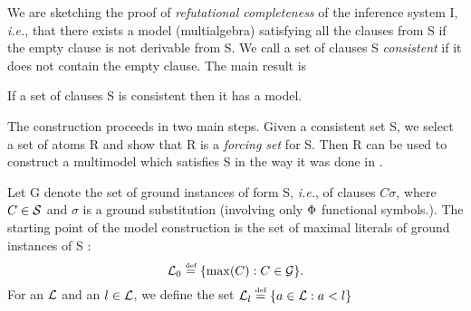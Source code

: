 %
%
%
We are sketching the proof of {\em refutational completeness} of the inference system
\C I, {\em i.e.}, that there exists a model (multialgebra) satisfying all the
clauses from \C S if the empty clause is not derivable from \C S.  We call a
set of clauses \C S {\em consistent} if it does not contain the empty clause.
The main result is

\begin{theorem}\label{completeness}
If a set of clauses \C S is consistent then it has a model.
\end{theorem}
\noindent
The construction proceeds in two main steps. Given a consistent set \C S,
we select a set of atoms \C R %
and show that \C R is a {\em forcing set}\/ for \C S.
Then %
\C R can be used to construct a multimodel which satisfies \C S in the
way it was done in \cite{KW}. 


Let \C G denote the set of ground instances of form \C S, {\it i.e.}, of
clauses \(C\sigma\), where \(C\in \mbox {$\cal S$}\) and $\sigma$ is a ground
substitution (involving only $\Phi$ functional symbols.).  
The starting point of the model construction is the set of
maximal literals of ground instances of \C S :
\begin{equation} \label{eq:max-literals}
\mbox {$\cal L$}_0 \mathrel {\stackrel {\mbox {\tiny def}}{=}} \{\max(C) : C\in \mbox {$\cal G$}\}.
\end{equation}
%
For an $\mbox {$\cal L$}$ and an $l\in\mbox {$\cal L$}$, we define the set \(\mbox {$\cal L$}_l\mathrel {\stackrel {\mbox {\tiny def}}{=}} \{a\in\mbox {$\cal L$}:a<l\}\)
%

